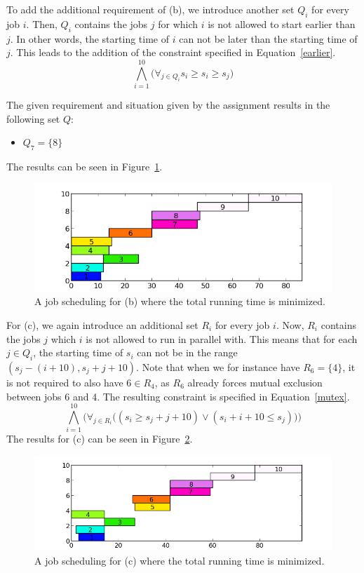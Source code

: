 To add the additional requirement of (b), we introduce another set $Q_i$ for every job $i$. Then, $Q_i$ contains the jobs $j$ for which $i$ is not allowed to start earlier than $j$. In other words, the starting time of $i$ can not be later than the starting time of $j$. This leads to the addition of the constraint specified in Equation~\ref{earlier}.
\begin{equation}
    \label{earlier}
    \bigwedge^{10}_{i=1}\big(\forall_{j\in Q_i} s_i \geq s_i \geq s_j \big)
\end{equation}

The given requirement and situation given by the assignment results in the following set $Q$:
\begin{itemize}
    \item $Q_7 = \{8\}$
\end{itemize}
The results can be seen in Figure~\ref{fig:3b}.
\begin{figure}[H]
    \centering
    \hspace*{-1cm}
    \includegraphics[width=\columnwidth]{3/b.pdf}
    \caption{A job scheduling for (b) where the total running time is minimized.}
    \label{fig:3b}
\end{figure}

For (c), we again introduce an additional set $R_i$ for every job $i$. Now, $R_i$ contains the jobs $j$ which $i$ is not allowed to run in parallel with. This means that for each $j \in Q_i$, the starting time of $s_i$ can not be in the range $(s_j - (i + 10), s_j + j + 10)$. Note that when we for instance have $R_6 = \{4\}$, it is not required to also have $6 \in R_4$, as $R_6$ already forces mutual exclusion between jobs 6 and 4. The resulting constraint is specified in Equation~\ref{mutex}.
\begin{equation}
    \label{mutex}
    \bigwedge^{10}_{i=1}\bigg(\forall_{j \in R_i}\big((s_i \geq s_j + j + 10) \vee (s_i + i + 10 \leq s_j)\big)\bigg)
\end{equation}
The results for (c) can be seen in Figure~\ref{fig:3c}.
\begin{figure}[H]
    \centering
    \hspace*{-1cm}
    \includegraphics[width=\columnwidth]{3/c.pdf}
    \caption{A job scheduling for (c) where the total running time is minimized.}
    \label{fig:3c}
\end{figure}